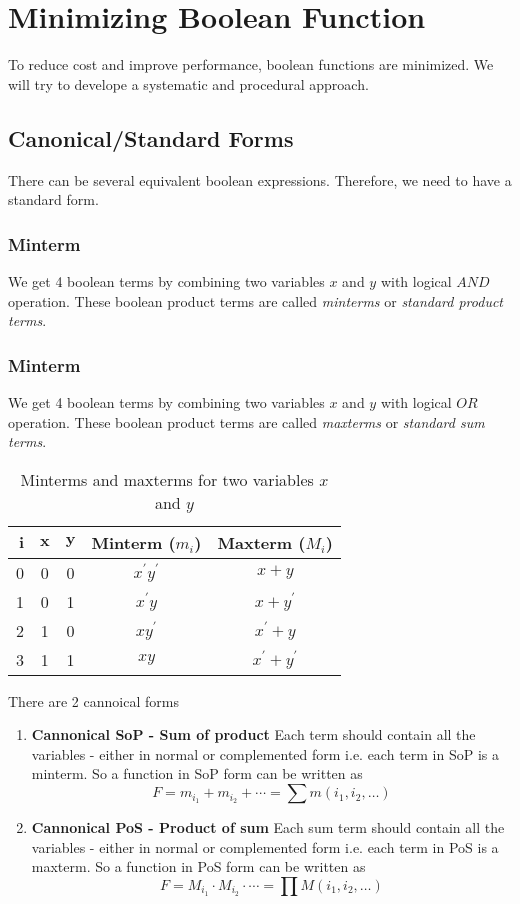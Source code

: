 \documentclass[oneside]{book}
\begin{document}
\section{Minimizing Boolean Function}
To reduce cost and improve performance, boolean functions are minimized. We will try to develope a systematic and procedural approach.
\subsection{Canonical/Standard Forms}
There can be several equivalent boolean expressions. Therefore, we need to have a standard form.
\subsubsection{Minterm}
We get 4 boolean terms by combining two variables $x$ and $y$ with logical $AND$ operation. These boolean product terms are called \textit{minterms} or \textit{standard product terms}.\cite{minterm_maxterm_definition}
\subsubsection{Minterm}
We get 4 boolean terms by combining two variables $x$ and $y$ with logical $OR$ operation. These boolean product terms are called \textit{maxterms} or \textit{standard sum terms}.\cite{minterm_maxterm_definition}
\begin{table}[ht]
	\centering
	\begin{tabular}{|r|cc|c|c|}
		\hline
		$\mathbf{i}$ & $\mathbf{x}$ & $\mathbf{y}$ & \textbf{Minterm} ($m_i$) & \textbf{Maxterm} ($M_i$) \\
		\hline
		0            & 0            & 0            & $x^\prime y^\prime$      & $x + y$                  \\
		1            & 0            & 1            & $x^\prime y$             & $x + y^\prime$           \\
		2            & 1            & 0            & $x y^\prime$             & $x^\prime + y$           \\
		3            & 1            & 1            & $x y$                    & $x^\prime + y^\prime$    \\
		\hline
	\end{tabular}
	\caption{Minterms and maxterms for two variables $x$ and $y$}
\end{table}
There are 2 cannoical forms
\begin{enumerate}
	\item \textbf{Cannonical SoP - Sum of product}
	      Each term should contain all the variables - either in normal or complemented form i.e. each term in SoP is a minterm. So a function in SoP form can be written as
	      \[
		      F = m_{i_1} + m_{i_2} + \cdots  = \sum m(i_1, i_2, \ldots)
	      \]
	\item \textbf{Cannonical PoS - Product of sum}
	      Each sum term should contain all the variables - either in normal or complemented form i.e. each term in PoS is a maxterm. So a function in PoS form can be written as
	      \[
		      F = M_{i_1} \cdot M_{i_2} \cdot \cdots  = \prod M(i_1, i_2, \ldots)
	      \]
\end{enumerate}
\end{document}
